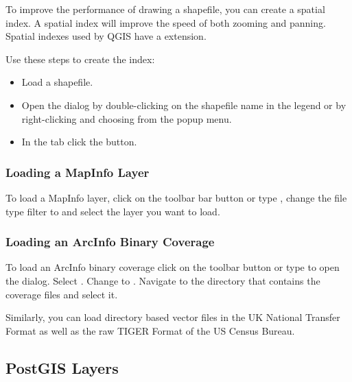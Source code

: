 To improve the performance of drawing a shapefile, you can create a spatial
index. A  spatial index will improve the 
speed of both zooming and panning. Spatial indexes used by QGIS have a 
 extension.

Use these steps to create the index:

\begin{itemize}
\item Load a shapefile.
\item Open the  dialog by double-clicking on the
shapefile name in the legend or by right-clicking and choosing
 from the popup menu.
\item In the tab  click the  button.
\end{itemize}

\subsubsection{Loading a MapInfo Layer}

To load a MapInfo layer, click on the  toolbar bar button or type , change the
file type filter to  and select the layer you want to load.

\subsubsection{Loading an ArcInfo Binary Coverage}

To load an ArcInfo binary coverage click on the
 toolbar button or type
 to open the  dialog. Select
. Change to . 
Navigate to the directory that contains the coverage files and select it.

Similarly, you can load directory based  vector files in the UK National Transfer Format as well as the 
raw TIGER Format of the US Census Bureau.

\subsection{PostGIS Layers}
\label{label_postgis} 

